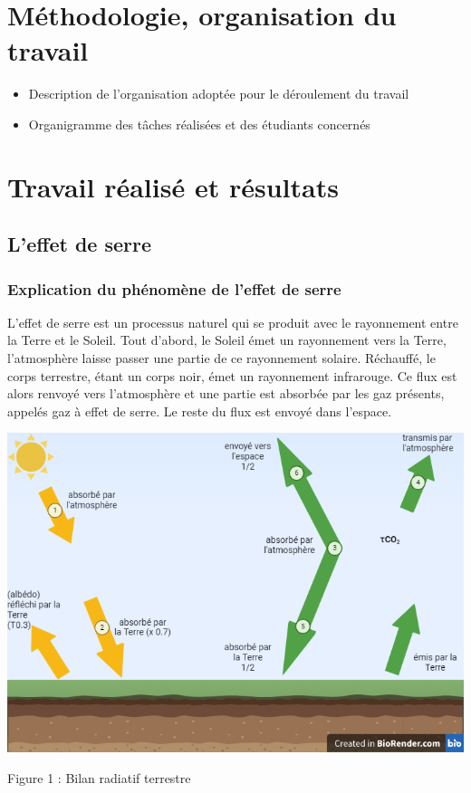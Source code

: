 \documentclass[a4paper, 12pt]{report} %
\begin{document}

\chapter{Méthodologie, organisation du travail}

\begin{itemize}
\item Description de l'organisation adoptée pour le déroulement du travail
\item Organigramme des tâches réalisées et des étudiants concernés
\end{itemize}


\chapter{Travail réalisé et résultats}

\section{L'effet de serre}

\subsection{Explication du phénomène de l'effet de serre}

	L'effet de serre est un processus naturel qui se produit 
avec le rayonnement entre la Terre et le Soleil. Tout d'abord, 
le Soleil émet un rayonnement vers la Terre, l'atmosphère 
laisse passer une partie de ce rayonnement solaire. 
Réchauffé, le corps terrestre, étant un corps noir, émet un rayonnement infrarouge. 
Ce flux est alors renvoyé vers l'atmosphère et une partie est absorbée par les gaz présents, appelés gaz à effet de serre. 
Le reste du flux est envoyé dans l'espace.

\begin{center}
    \includegraphics[scale=0.35]{Images/schemaflux.png} 
    
    Figure 1 : Bilan radiatif terrestre
\end{center} 
\end{document}
